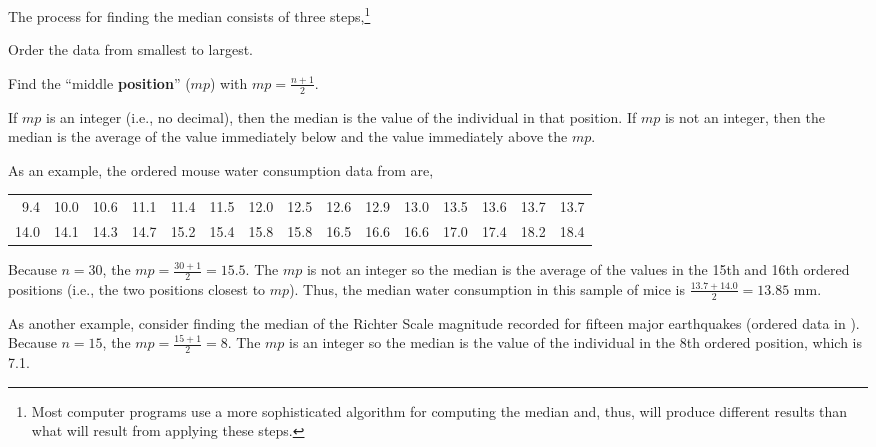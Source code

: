 \documentclass[10pt,openany]{book}\usepackage[]{graphicx}\usepackage[]{color}
\begin{document}
The process for finding the median consists of three steps,\footnote{Most computer programs use a more sophisticated algorithm for computing the median and, thus, will produce different results than what will result from applying these steps.}
\begin{Enumerate}
  \item Order the data from smallest to largest.
  \item Find the ``middle \textbf{position}'' ($mp$) with $mp=\frac{n+1}{2}$.
  \item If $mp$ is an integer (i.e., no decimal), then the median is the value of the individual in that position.  If $mp$ is not an integer, then the median is the average of the value immediately below and the value immediately above the $mp$.
\end{Enumerate}

As an example, the ordered mouse water consumption data from  are,

\begin{tabular}{rrrrrrrrrrrrrrr}
  9.4 & 10.0 & 10.6 & 11.1 & 11.4 & 11.5 & 12.0 & 12.5 & 12.6 & 12.9 & 13.0 & 13.5 & 13.6 & 13.7 & 13.7 \\ 
  14.0 & 14.1 & 14.3 & 14.7 & 15.2 & 15.4 & 15.8 & 15.8 & 16.5 & 16.6 & 16.6 & 17.0 & 17.4 & 18.2 & 18.4 \\ 
  \end{tabular}


Because $n=30$, the $mp=\frac{30+1}{2}=15.5$.  The $mp$ is not an integer so the median is the average of the values in the 15th and 16th ordered positions (i.e., the two positions closest to $mp$).  Thus, the median water consumption in this sample of mice is $\frac{13.7+14.0}{2}=13.85$ mm.

As another example, consider finding the median of the Richter Scale magnitude recorded for fifteen major earthquakes (ordered data in ).  Because $n=15$, the $mp=\frac{15+1}{2}=8$.  The $mp$ is an integer so the median is the value of the individual in the 8th ordered position, which is 7.1.

\end{document}
